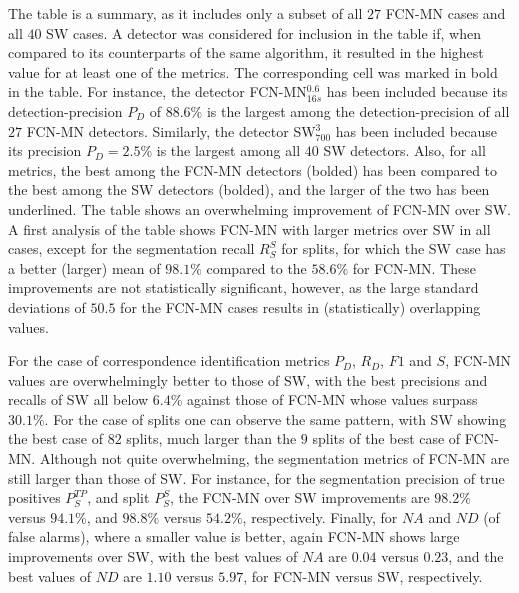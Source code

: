 \documentclass[a4paper,authoryear,review]{elsarticle}
\begin{document}
The table is a summary, as it includes only a subset of all $27$ FCN-MN cases and all $40$ SW cases. A detector was considered for inclusion in the table if, when compared to its counterparts of the same algorithm, it resulted in the highest value for at least one of the metrics. The corresponding cell was marked in bold in the table. For instance, the detector FCN-MN$_{16s}^{0.6}$ has been included because its detection-precision $P_D$ of $88.6\%$ is the largest among the detection-precision of all $27$ FCN-MN detectors. Similarly, the detector SW$_{700}^3$ has been included because its precision $P_D = 2.5\%$ is the largest among all $40$ SW detectors. 
%
Also, for all metrics, the best among the FCN-MN detectors (bolded) has been compared to the best among the SW detectors (bolded), and the larger of the two has been underlined.
%
The table shows an overwhelming improvement of FCN-MN over SW. 
%
A first analysis of the table shows FCN-MN with larger metrics over SW in all cases, except for the segmentation recall $R_S^{S}$ for splits, for which the SW case has a better (larger) mean of $98.1\%$ compared to the $58.6\%$ for FCN-MN. These improvements are not statistically significant, however, as the large standard deviations of $50.5$ for the FCN-MN cases results in (statistically) overlapping values. 

For the case of correspondence identification metrics $P_D$, $R_D$, $F1$ and $S$, FCN-MN values are overwhelmingly better to those of SW, with the best precisions and recalls of SW all below $6.4\%$ against those of FCN-MN whose values surpass $30.1\%$. For the case of splits one can observe the same pattern, with SW showing the best case of $82$ splits, much larger than the $9$ splits of the best case of FCN-MN.
%
Although not quite overwhelming, the segmentation metrics of FCN-MN are still larger than those of SW. For instance, for the segmentation precision of true positives $P_S^{TP}$, and split $P_S^{S}$, the FCN-MN over SW improvements are $98.2\%$ versus $94.1\%$, and $98.8\%$ versus $54.2\%$, respectively. 
%
Finally, for $NA$ and $ND$ (of false alarms), where a smaller value is better, again FCN-MN shows large improvements over SW, with the best values of $NA$ are $0.04$ versus $0.23$, and the best values of $ND$ are $1.10$ versus $5.97$, for FCN-MN versus SW, respectively. 
\end{document}
